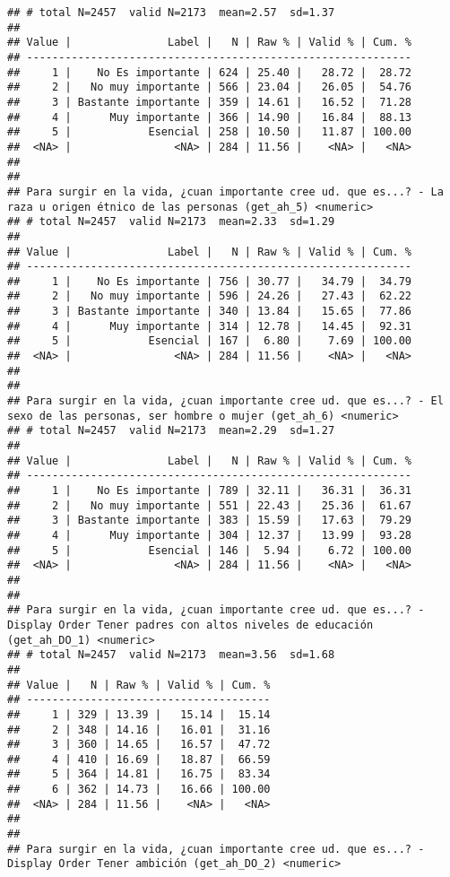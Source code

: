 \documentclass[
  10,
  landscape,
  legalpaper]{article}
\begin{document}
\begin{verbatim}
## # total N=2457  valid N=2173  mean=2.57  sd=1.37
## 
## Value |               Label |   N | Raw % | Valid % | Cum. %
## ------------------------------------------------------------
##     1 |    No Es importante | 624 | 25.40 |   28.72 |  28.72
##     2 |   No muy importante | 566 | 23.04 |   26.05 |  54.76
##     3 | Bastante importante | 359 | 14.61 |   16.52 |  71.28
##     4 |      Muy importante | 366 | 14.90 |   16.84 |  88.13
##     5 |            Esencial | 258 | 10.50 |   11.87 | 100.00
##  <NA> |                <NA> | 284 | 11.56 |    <NA> |   <NA>
## 
## 
## Para surgir en la vida, ¿cuan importante cree ud. que es...? - La raza u origen étnico de las personas (get_ah_5) <numeric>
## # total N=2457  valid N=2173  mean=2.33  sd=1.29
## 
## Value |               Label |   N | Raw % | Valid % | Cum. %
## ------------------------------------------------------------
##     1 |    No Es importante | 756 | 30.77 |   34.79 |  34.79
##     2 |   No muy importante | 596 | 24.26 |   27.43 |  62.22
##     3 | Bastante importante | 340 | 13.84 |   15.65 |  77.86
##     4 |      Muy importante | 314 | 12.78 |   14.45 |  92.31
##     5 |            Esencial | 167 |  6.80 |    7.69 | 100.00
##  <NA> |                <NA> | 284 | 11.56 |    <NA> |   <NA>
## 
## 
## Para surgir en la vida, ¿cuan importante cree ud. que es...? - El sexo de las personas, ser hombre o mujer (get_ah_6) <numeric>
## # total N=2457  valid N=2173  mean=2.29  sd=1.27
## 
## Value |               Label |   N | Raw % | Valid % | Cum. %
## ------------------------------------------------------------
##     1 |    No Es importante | 789 | 32.11 |   36.31 |  36.31
##     2 |   No muy importante | 551 | 22.43 |   25.36 |  61.67
##     3 | Bastante importante | 383 | 15.59 |   17.63 |  79.29
##     4 |      Muy importante | 304 | 12.37 |   13.99 |  93.28
##     5 |            Esencial | 146 |  5.94 |    6.72 | 100.00
##  <NA> |                <NA> | 284 | 11.56 |    <NA> |   <NA>
## 
## 
## Para surgir en la vida, ¿cuan importante cree ud. que es...? - Display Order Tener padres con altos niveles de educación (get_ah_DO_1) <numeric>
## # total N=2457  valid N=2173  mean=3.56  sd=1.68
## 
## Value |   N | Raw % | Valid % | Cum. %
## --------------------------------------
##     1 | 329 | 13.39 |   15.14 |  15.14
##     2 | 348 | 14.16 |   16.01 |  31.16
##     3 | 360 | 14.65 |   16.57 |  47.72
##     4 | 410 | 16.69 |   18.87 |  66.59
##     5 | 364 | 14.81 |   16.75 |  83.34
##     6 | 362 | 14.73 |   16.66 | 100.00
##  <NA> | 284 | 11.56 |    <NA> |   <NA>
## 
## 
## Para surgir en la vida, ¿cuan importante cree ud. que es...? - Display Order Tener ambición (get_ah_DO_2) <numeric>

\end{verbatim}
\end{document}
